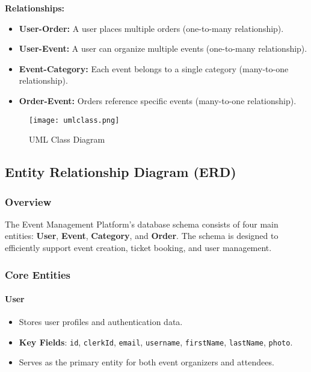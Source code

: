 \textbf{Relationships:}  
\begin{itemize}
    \item \textbf{User-Order:}  
    A user places multiple orders (one-to-many relationship).  
    \item \textbf{User-Event:}  
    A user can organize multiple events (one-to-many relationship).  
    \item \textbf{Event-Category:}  
    Each event belongs to a single category (many-to-one relationship).  
    \item \textbf{Order-Event:}  
    Orders reference specific events (many-to-one relationship).  
\end{itemize}


\begin{figure}[H]
	\centering	\texttt{[image: umlclass.png]}
    \caption{UML Class Diagram}
    \end{figure}



\subsection{Entity Relationship Diagram (ERD)}

\subsubsection{Overview}
The Event Management Platform's database schema consists of four main entities: \textbf{User}, \textbf{Event}, \textbf{Category}, and \textbf{Order}. The schema is designed to efficiently support event creation, ticket booking, and user management.

\subsubsection{Core Entities}
\paragraph{User}
\begin{itemize}
    \item Stores user profiles and authentication data.
    \item \textbf{Key Fields}: \texttt{id}, \texttt{clerkId}, \texttt{email}, \texttt{username}, \texttt{firstName}, \texttt{lastName}, \texttt{photo}.
    \item Serves as the primary entity for both event organizers and attendees.
\end{itemize}

